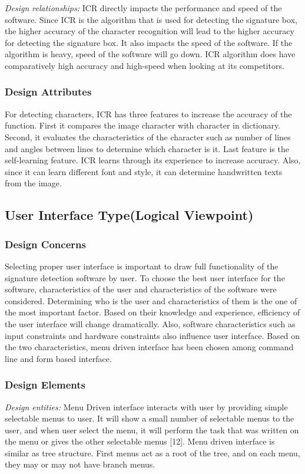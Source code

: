 \documentclass[onecolumn, draftclsnofoot,10pt, compsoc]{IEEEtran}
\begin{document}
	\emph{Design relationships:}
ICR directly impacts the performance and speed of the software. Since ICR is the algorithm that is used for detecting the signature box, the higher accuracy of the character recognition will lead to the higher accuracy for detecting the signature box. It also impacts the speed of the software. If the algorithm is heavy, speed of the software will go down. ICR algorithm does have comparatively high accuracy and high-speed when looking at its competitors.

\subsubsection{Design Attributes}
For detecting characters, ICR has three features to increase the accuracy of the function. First it compares the image character with character in dictionary. Second, it evaluates the characteristics of the character such as number of lines and angles between lines to determine which character is it. Last feature is the self-learning feature. ICR learns through its experience to increase accuracy. Also, since it can learn different font and style, it can determine handwritten texts from the image.


\subsection{User Interface Type(Logical Viewpoint)}
\subsubsection{Design Concerns}
Selecting proper user interface is important to draw full functionality of the signature detection software by user. To choose the best user interface for the software, characteristics of the user and characteristics of the software were considered. Determining who is the user and characteristics of them is the one of the most important factor. Based on their knowledge and experience, efficiency of the user interface will change dramatically. Also, software characteristics such as input constraints and hardware constraints also influence user interface. Based on the two characteristics, menu driven interface has been chosen among command line and form based interface. 

\subsubsection{Design Elements}
	\emph{Design entities:} 
Menu Driven interface interacts with user by providing simple selectable menus to user. It will show a small number of selectable menus to the user, and when user select the menu, it will perform the task that was written on the menu or gives the other selectable menus [12]. Menu driven interface is similar as tree structure. First menus act as a root of the tree, and on each menu, they may or may not have branch menus.
\end{document}
